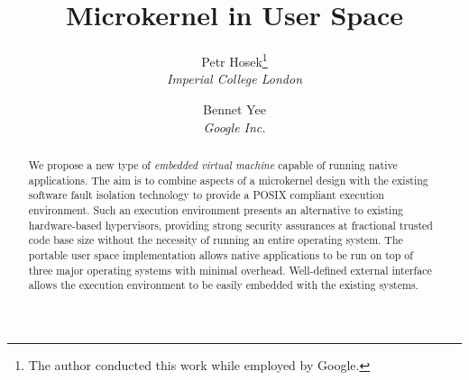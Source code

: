 \documentclass[twocolumn,10pt]{article}
\begin{document}
\title{\bf Microkernel in User Space}
\author{
Petr Hosek\footnote{The author conducted this work while employed by
Google.}\\\textit{Imperial College London}
\and Bennet Yee\\\textit{Google Inc.}
}
\date{}
\maketitle
\thispagestyle{empty}

\begin{abstract}
  We propose a new type of \emph{embedded virtual machine} capable of
  running native applications. The aim is to combine aspects of a
  microkernel design with the existing software fault isolation
  technology to provide a POSIX compliant execution environment. Such an
  execution environment presents an alternative to existing
  hardware-based hypervisors, providing strong security assurances at
  fractional trusted code base size without the necessity of running an
  entire operating system. The portable user space implementation allows
  native applications to be run on top of three major operating systems
  with minimal overhead. Well-defined external interface allows the
  execution environment to be easily embedded with the existing systems.




\end{abstract}








{
  
  
}
\end{document}
